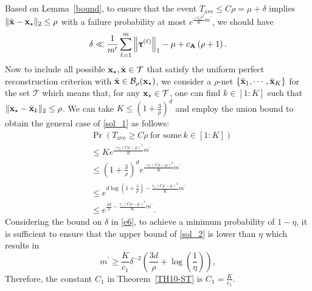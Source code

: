 \documentclass[12pt,draftcls,onecolumn]{IEEEtran}
\begin{document}
Based on Lemma~\ref{bound}, to ensure that the event $T_{\mathrm{ave}}\leq C\rho=\mu+\delta$ implies $\|\bar{\mathbf{x}}-\mathbf{x}_{\star}\|_2\leq\rho$ with a failure probability at most $e^{\frac{-c_1\delta^2}{K}m^{\prime}}$, we should have
\begin{equation}
\label{e6}
\delta\ll\frac{1}{m^{\prime}}\sum_{\ell=1}^{m}\left\|\boldsymbol{\uptau}^{(\ell)}\right\|_1-\mu
+c_{\mbA}\left(\rho+1\right).
\end{equation}
Now to include all possible $\mathbf{x}_{\star},\bar{\mathbf{x}}\in\mathcal{T}$ that satisfy the uniform perfect reconstruction criterion with $\bar{\mathbf{x}}\in\mathcal{B}_{\rho}(\mathbf{x}_{\star})$, we consider a $\rho$-net $\left\{\bar{\mathbf{x}}_1,\cdots,\bar{\mathbf{x}}_K\right\}$ for the set $\mathcal{T}$ which means that, for any $\mathbf{x}_{\star}\in\mathcal{T}$, one can find $k\in[1:K]$ such that $\|\mathbf{x}_{\star}-\bar{\mathbf{x}}_k\|_2\leq\rho$. 
We can take $K\leq\left(1+\frac{3}{\rho}\right)^{d}$ \cite{vershynin2007math} and
employ the union bound to obtain the general case of \eqref{sol_1} as follows:
\begin{equation}
\label{sol_2}
\begin{aligned}
&\operatorname{Pr}\left(T_{\mathrm{ave}}\geq C\rho~\text{for some}~k\in[1:K]\right)\\&\leq Ke^{\frac{-c_1\left(C\rho-\mu\right)^{2}}{K}m^{\prime}}\\&\leq\left(1+\frac{3}{\rho}\right)^{d}e^{\frac{-c_1\left(C\rho-\mu\right)^{2}}{K}m^{\prime}}\\&\leq e^{d\log\left(1+\frac{3}{\rho}\right)-\frac{c_1\left(C\rho-\mu\right)^{2}}{K}m^{\prime}}\\&\leq e^{\frac{3d}{\rho}-\frac{c_1\left(C\rho-\mu\right)^{2}}{K}m^{\prime}}.
\end{aligned}
\end{equation}
Considering the bound on $\delta$ in \eqref{e6},
to achieve a minimum probability of $1-\eta$, it is sufficient to ensure that the upper bound of \eqref{sol_2} is lower than $\eta$ which results in
\begin{equation}
\label{sol_3}
m^{\prime}\geq \frac{K}{c_1}\delta^{-2}\left(\frac{3d}{\rho}+\log\left(\frac{1}{\eta}\right)\right), 
\end{equation}
Therefore, the constant $C_1$ in Theorem~\ref{TH10-ST} is $C_1=\frac{K}{c_1}$.
\end{document}
